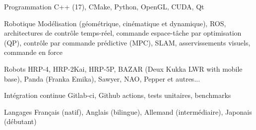 

\begin{cvskills}

  \cvskill
    {Programmation} %
    {C++ (17), CMake, Python, OpenGL, CUDA, Qt} %

  \cvskill
    {Robotique} %
    {Modélisation (géométrique, cinématique et dynamique), ROS, architectures de contrôle temps-réel, commande espace-tâche par optimisation (QP), contrôle par commande prédictive (MPC), SLAM, asservissements visuels, commande en force} %

  \cvskill
    {Robots} %
    {HRP-4, HRP-2Kai, HRP-5P, BAZAR (Deux Kukka LWR with mobile base), Panda (Franka Emika), Sawyer, NAO, Pepper et autres...} %

  \cvskill
    {Intégration continue} %
    {Gitlab-ci, Github actions, tests unitaires, benchmarks} %

  \cvskill
    {Langages} %
    {Français (natif), Anglais (bilingue), Allemand (intermédiaire), Japonais (débutant)} %

\end{cvskills}
